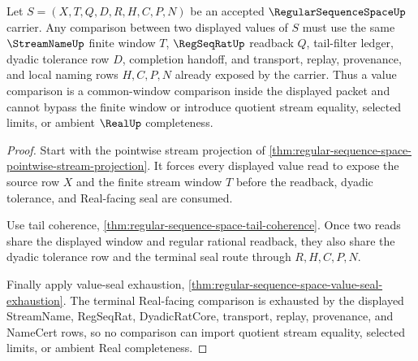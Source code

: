 \begin{theorem}
\label{thm:regular-sequence-space-window-comparison}
Let $S=(X,T,Q,D,R,H,C,P,N)$ be an accepted $\RegularSequenceSpaceUp$ carrier. Any comparison between two displayed values of $S$ must use the same $\StreamNameUp$ finite window $T$, $\RegSeqRatUp$ readback $Q$, tail-filter ledger, dyadic tolerance row $D$, completion handoff, and transport, replay, provenance, and local naming rows $H,C,P,N$ already exposed by the carrier. Thus a value comparison is a common-window comparison inside the displayed packet and cannot bypass the finite window or introduce quotient stream equality, selected limits, or ambient $\RealUp$ completeness.
\end{theorem}
\begin{proof}
Start with the pointwise stream projection of \autoref{thm:regular-sequence-space-pointwise-stream-projection}. It forces every displayed value read to expose the source row $X$ and the finite stream window $T$ before the readback, dyadic tolerance, and Real-facing seal are consumed.

Use tail coherence, \autoref{thm:regular-sequence-space-tail-coherence}. Once two reads share the displayed window and regular rational readback, they also share the dyadic tolerance row and the terminal seal route through $R,H,C,P,N$.

Finally apply value-seal exhaustion, \autoref{thm:regular-sequence-space-value-seal-exhaustion}. The terminal Real-facing comparison is exhausted by the displayed StreamName, RegSeqRat, DyadicRatCore, transport, replay, provenance, and NameCert rows, so no comparison can import quotient stream equality, selected limits, or ambient Real completeness.
\end{proof}

